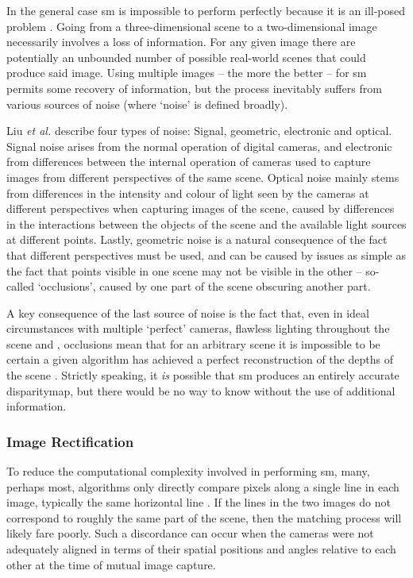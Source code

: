 In the general case \gls{sm} is impossible to perform perfectly because it is an ill-posed problem \cite{Gimelfarb1998}.  Going from a three-dimensional scene to a two-dimensional image necessarily involves a loss of information.  For any given image there are potentially an unbounded number of possible real-world scenes that could produce said image.  Using multiple images -- the more the better -- for \gls{sm} permits some recovery of information, but the process inevitably suffers from various sources of noise (where `noise' is defined broadly).

Liu \textit{et al.} \cite{Liu2005} describe four types of noise:  Signal, geometric, electronic and optical.  Signal noise arises from the normal operation of digital cameras, and electronic from differences between the internal operation of cameras used to capture images from different perspectives of the same scene.  Optical noise mainly stems from differences in the intensity and colour of light seen by the cameras at different perspectives when capturing images of the scene, caused by differences in the interactions between the objects of the scene and the available light sources at different points.  Lastly, geometric noise is a natural consequence of the fact that different perspectives must be used, and can be caused by issues as simple as the fact that points visible in one scene may not be visible in the other -- so-called `occlusions', caused by one part of the scene obscuring another part.

A key consequence of the last source of noise is the fact that, even in ideal circumstances with multiple `perfect' cameras, flawless lighting throughout the scene and , occlusions mean that for an arbitrary scene it is impossible to be certain a given algorithm has achieved a perfect reconstruction of the depths of the scene \cite{Gimelfarb1998}.  Strictly speaking, it \emph{is} possible that \gls{sm} produces an entirely accurate \gls{disparitymap}, but there would be no way to know without the use of additional information.


\subsubsection{Image Rectification}
To reduce the computational complexity involved in performing \gls{sm}, many, perhaps most, algorithms only directly compare pixels along a single line in each image, typically the same horizontal line \cite[Ch. 11]{Szeliski2011}.  If the lines in the two images do not correspond to roughly the same part of the scene, then the matching process will likely fare poorly.  Such a discordance can occur when the cameras were not adequately aligned in terms of their spatial positions and angles relative to each other at the time of mutual image capture.

